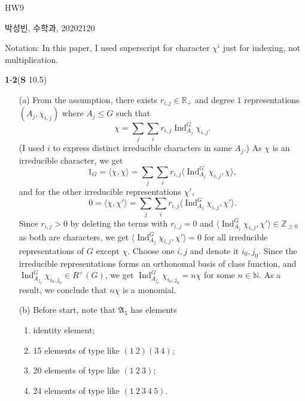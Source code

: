 \documentclass[a4paper, 12pt]{article}
\theoremstyle{Mydefinition}
\theoremstyle{Mytheorem}
\DeclareMathOperator{\Ind}{Ind}
\begin{document}
\thispagestyle{myfirstpage}
\begin{center}
    \Large{HW9}
\end{center}
박성빈, 수학과, 20202120

Notation: In this paper, I used superscript for character $\chi^i$ just for indexing, not multiplication.

\noindent \textbf{1}-\textbf{2}(\textbf{S} 10.5)
\begin{enumerate}
    \item[(a)] From the assumption, there exists $r_{i,j}\in\mathbb{R}_+$ and degree $1$ representations $(A_j, \chi_{i,j})$ where $A_j\leq G$ such that
    \begin{equation}
        \chi = \sum_j \sum_i r_{i,j} \Ind_{A_j}^G \chi_{i,j}.
    \end{equation}
    (I used $i$ to express distinct irreducible characters in same $A_j$.) As $\chi$ is an irreducible character, we get
    \begin{equation}
        1_G=\langle \chi, \chi\rangle = \sum_j\sum_i r_{i,j} \langle \Ind_{A_j}^G \chi_{i,j}, \chi\rangle,
    \end{equation}
    and for the other irreducible representations $\chi'$,
    \begin{equation}
        0=\langle \chi, \chi'\rangle = \sum_j\sum_i r_{i,j} \langle \Ind_{A_j}^G \chi_{i,j}, \chi'\rangle.
    \end{equation}
    Since $r_{i,j}>0$ by deleting the terms with $r_{i,j}=0$ and $\langle \Ind_{A_j}^G \chi_{i,j}, \chi'\rangle\in\mathbb{Z}_{\geq 0}$ as both are characters, we get $\langle \Ind_{A_j}^G \chi_{i,j}, \chi'\rangle=0$ for all irreducible representations of $G$ except $\chi$. Choose one $i,j$ and denote it $i_0,j_0$. Since the irreducible representations forms an orthonomal basis of class function, and $\Ind_{A_{j_0}}^G \chi_{i_0,j_0}\in R^+(G)$, we get $\Ind^G_{A_{j_0}} \chi_{i_0,j_0} = n\chi$ for some $n\in\mathbb{N}$. As a result, we conclude that $n\chi$ is a monomial.
    \item[(b)] Before start, note that $\mathfrak{A}_5$ has elements
    \begin{enumerate}
        \item identity element;
        \item 15 elements of type like $(1~2)(3~4)$;
        \item 20 elements of type like $(1~2~3)$;
        \item 24 elements of type like $(1~2~3~4~5)$.
    \end{enumerate}
    

\end{enumerate}
\end{document}
